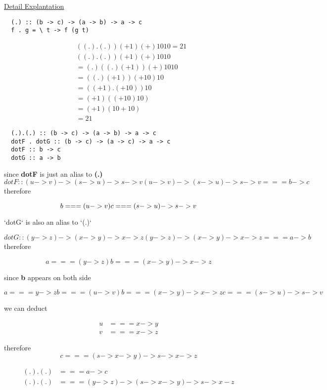\begin{WrapText}
  \href{https://www.reddit.com/r/haskellquestions/comments/ayi445/help_me_understand_the_function_and_its_type}{Detail Explantation}

  \begin{verbatim}
  (.) :: (b -> c) -> (a -> b) -> a -> c
  f . g = \ t -> f (g t)
  \end{verbatim}


  \begin{align*}
  & ((.).(.)) (+1) (+) 10 10 = 21 \\
  &  ((.).(.)) (+1) (+) 10 10 \\
  & =  (.)((.) (+1)) (+) 10 10 \\
  & =  ((.) (+1)) (+ 10) 10   \\
  & = ((+1). (+10)) 10 \\
  & = (+1) ((+10) 10) \\
  & = (+1) (10 + 10) \\
  & = 21
  \end{align*}

  \begin{verbatim}
  (.).(.) :: (b -> c) -> (a -> b) -> a -> c
  dotF . dotG :: (b -> c) -> (a -> c) -> a -> c
  dotF :: b -> c
  dotG :: a -> b
  \end{verbatim}

  since \textbf{dotF} is just an alias to  \textbf{(.)}
  \begin{equation}
  dotF :: (u -> v) -> (s -> u) -> s -> v
  (u -> v) -> (s -> u) -> s -> v === b -> c
  \end{equation}
  therefore

  \begin{equation}
  b === (u -> v) \\
  c === (s -> u) -> s -> v
  \end{equation}

  `dotG` is also an alias to `(.)`

  \begin{equation}
  dotG :: (y -> z) -> (x -> y) -> x -> z
  (y -> z) -> (x -> y) -> x -> z === a -> b
  \end{equation}
  therefore

  \begin{equation}
  a === (y -> z)
  b === (x -> y) -> x -> z
  \end{equation}

  since \textbf{b} appears on both side

  \begin{equation}
  a === y -> z
  b === (u -> v)
  b === (x -> y) -> x -> z
  c === (s -> u) -> s -> v
  \end{equation}

  we can deduct

  \begin{align*}
  u &=== x -> y  \\
  v &=== x -> z
  \end{align*}

  therefore \begin{equation}c === (s -> x -> y) -> s -> x -> z\end{equation}

  \begin{align*}
  (.).(.) & === a -> c \\
  (.).(.) & === (y -> z) -> (s -> x -> y) -> s -> x - z
  \end{align*}
  \end{WrapText}
